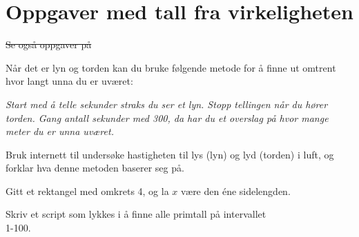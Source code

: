 




\section{Oppgaver med tall fra virkeligheten}	
\st{Se også oppgaver på }	
	
Når det er lyn og torden kan du bruke følgende metode for å finne ut omtrent hvor langt unna du er uværet:\os

\textsl{Start med å telle sekunder straks du ser et lyn. Stopp tellingen når du hører torden. Gang antall sekunder med 300, da har du et overslag på hvor mange meter du er unna uværet.}\os

Bruk internett til undersøke hastigheten til lys (lyn) og lyd (torden) i luft, og forklar hva denne metoden baserer seg på.


Gitt et rektangel med omkrets 4, og la $ x $ være den éne sidelengden.

Skriv et script som lykkes i å finne alle primtall på intervallet\\ 1-100.

\newpage


